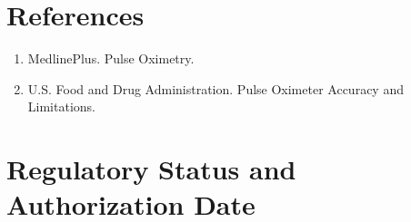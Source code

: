 \section*{References}
\begin{enumerate}
  \item MedlinePlus. Pulse Oximetry.
  \item U.S. Food and Drug Administration. Pulse Oximeter Accuracy and Limitations.
\end{enumerate}

\clearpage


\section*{Regulatory Status and Authorization Date}

\clearpage
